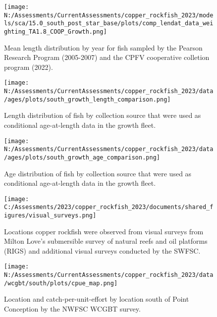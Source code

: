 \documentclass[11pt,
  english,
  letterpaper,
]{article}
\begin{document}
\pagebreak

\begin{figure}
\centering
\texttt{[image: N:/Assessments/CurrentAssessments/copper\_rockfish\_2023/models/sca/15.0\_south\_post\_star\_base/plots/comp\_lendat\_data\_weighting\_TA1.8\_COOP\_Growth.png]}
\caption{Mean length distribution by year for fish sampled by the Pearson Research Program (2005-2007) and the CPFV cooperative colletion program (2022).\label{fig:growth-mean-coop-len}}
\end{figure}

\pagebreak

\begin{figure}
\centering
\texttt{[image: N:/Assessments/CurrentAssessments/copper\_rockfish\_2023/data/ages/plots/south\_growth\_length\_comparison.png]}
\caption{Length distribution of fish by collection source that were used as conditional age-at-length data in the growth fleet.\label{fig:growth-len-dist}}
\end{figure}

\pagebreak

\begin{figure}
\centering
\texttt{[image: N:/Assessments/CurrentAssessments/copper\_rockfish\_2023/data/ages/plots/south\_growth\_age\_comparison.png]}
\caption{Age distribution of fish by collection source that were used as conditional age-at-length data in the growth fleet.\label{fig:growth-age-dist}}
\end{figure}

\pagebreak

\begin{figure}
\centering
\texttt{[image: C:/Assessments/2023/copper\_rockfish\_2023/documents/shared\_figures/visual\_surveys.png]}
\caption{Locations copper rockfish were observed from visual surveys from Milton Love's submersible survey of natural reefs and oil platforms (RIGS) and additional visual surveys conducted by the SWFSC.\label{fig:visual-surveys}}
\end{figure}

\begin{figure}
\centering
\texttt{[image: N:/Assessments/CurrentAssessments/copper\_rockfish\_2023/data/wcgbt/south/plots/cpue\_map.png]}
\caption{Location and catch-per-unit-effort by location south of Point Conception by the NWFSC WCGBT survey.\label{fig:wcgbt-cpue}}
\end{figure}
\end{document}
